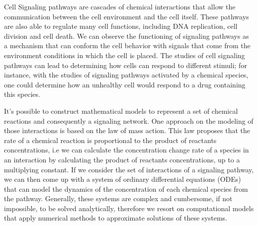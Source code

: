 




Cell Signaling pathways are cascades of chemical interactions that 
allow the communication between the cell environment and the 
cell itself. These pathways are also able to regulate many cell 
functions, including DNA replication, cell division and cell death. We
can observe the functioning of signaling pathways as a mechanism that 
can conform the cell behavior with signals that come from the 
environment conditions in which the cell is placed. The studies of cell 
signaling pathways can lead to determining how cells can respond to 
different stimuli; for instance, with the studies of signaling pathways
activated by a chemical species, one could determine how an unhealthy 
cell would respond to a drug containing this species.

It's possible to construct mathematical models to represent a set of
chemical reactions and consequently a signaling network. One approach on 
the modeling of those interactions is based on the law of mass action. 
This law proposes that the rate of a chemical reaction is proportional 
to the product of reactants concentrations, i.e we can calculate the 
concentration change rate of a species in an interaction by calculating 
the product of reactants concentrations, up to a multiplying constant. 
If we consider the set of interactions of a signaling pathway, we can
then come up with a system of ordinary differential equations (ODEs) 
that can model the dynamics of the concentration of each chemical 
species from the pathway. Generally, these systems are complex and 
cumbersome, if not impossible, to be solved analytically, therefore we 
resort on computational models that apply numerical methods to 
approximate solutions of these systems.

